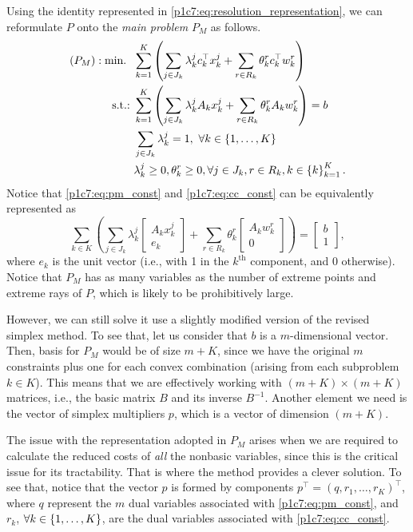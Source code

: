 Using the identity represented in \eqref{p1c7:eq:resolution_representation}, we can reformulate $P$ onto the \emph{main problem} $P_M$ as follows.
%
\begin{align} 
	(P_M) : \mathop{\text{min.~}} \ & \sum_{k =1}^K \left(\sum_{j \in J_k} \lambda_k^jc_k ^\top x^j_k   + \sum_{r \in R_k} \theta_{k}^rc_k^\top w_k^r \right)	\nonumber\\
	\mathop{\text{s.t.:~}} & \sum_{k = 1}^K \left(\sum_{j \in J_k}\lambda_k^j A_k x_k^j + \sum_{r \in R_k} \theta_k^r A_k w_k^r\right) = b \label{p1c7:eq:pm_const}\\
	& \sum_{j \in J_k}\lambda_k^j = 1, \ \forall k \in \left\{ 1,\dots,K \right \} \label{p1c7:eq:cc_const}\\
	& \lambda_k^j \geq 0,  \theta_k^r \geq 0, \forall j \in J_k, r \in R_k, k \in \left\{ k \right \}_{k=1}^K. \nonumber 
\end{align}
%
Notice that \eqref{p1c7:eq:pm_const} and \eqref{p1c7:eq:cc_const} can be equivalently represented as
%
\begin{equation*}
	\sum_{k \in K}\left(\sum_{j \in J_k}\lambda_k^j \begin{bmatrix} A_kx_k^j \\ e_k\end{bmatrix} + \sum_{r \in R_k}\theta_k^r \begin{bmatrix} A_kw_k^r \\ 0\end{bmatrix}\right) = \begin{bmatrix} b \\ 1\end{bmatrix},
\end{equation*}
%	  	   
where $e_k$ is the unit vector (i.e., with 1 in the $k^\text{th}$ component, and $0$ otherwise). Notice that $P_M$ has as many variables as the number of extreme points and extreme rays of $P$, which is likely to be prohibitively large.

However, we can still solve it use a slightly modified version of the revised simplex method. To see that, let us consider that $b$ is a $m$-dimensional vector. Then, basis for $P_M$ would be of size $m + K$, since we have the original $m$ constraints plus one for each convex combination (arising from each subproblem $k \in K$). This means that we are effectively working with $(m + K) \times (m + K)$ matrices, i.e., the basic matrix $B$ and its inverse $B^{-1}$. Another element we need is the vector of simplex multipliers $p$, which is a vector of dimension $(m + K)$.

The issue with the representation adopted in $P_M$ arises when we are required to calculate the reduced costs of \emph{all} the nonbasic variables, since this is the critical issue for its tractability. That is where the method provides a clever solution. To see that, notice that the vector $p$ is formed by components $p^\top = (q, r_1, \dots, r_K)^\top$, where $q$ represent the $m$ dual variables associated with \eqref{p1c7:eq:pm_const}, and $r_k$, $\forall k \in \left\{ 1,\dots,K \right \}$, are the dual variables associated with \eqref{p1c7:eq:cc_const}. 

